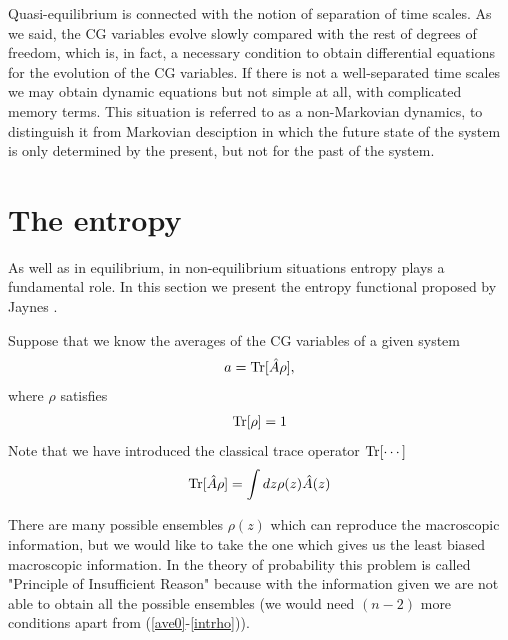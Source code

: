 \documentclass[a4paper,openright,12pt]{book}
\begin{document}
Quasi-equilibrium is connected with the notion of separation of time scales. As we said, the CG variables evolve slowly compared with the rest of degrees of freedom, which is, in fact, a necessary condition to obtain differential equations for the evolution of the CG variables. If there is not a well-separated time scales we may obtain dynamic equations but not simple at all, with complicated memory terms. This situation is referred to as a non-Markovian dynamics, to distinguish it from Markovian desciption in which the future state of the system is only determined by the present, but not for the past of the system. 

\section{The entropy}\label{sec:TheEntropy}
As well as in equilibrium, in non-equilibrium situations entropy plays a fundamental role. In this section we present the entropy functional proposed by Jaynes \cite{Jaynes1957}.

Suppose that we know the averages of the CG variables of a given system 
\begin{align}
    a = {\rm Tr}[{\hat{A}}\rho] ,
    \label{ave0}
\end{align}
where $\rho$ satisfies
\begin{align}
    {\rm Tr}[\rho] = 1
    \label{intrho}
\end{align}
Note that we have introduced the classical trace operator ${\rm Tr}[\cdots]$
\begin{align}
    {\rm Tr}[\hat{A}\rho] = \int dz\rho(z)\hat{A}(z) 
\end{align}

There are many possible ensembles $\rho(z)$ which can reproduce the macroscopic information, but we would like to take the one which gives us the least biased macroscopic information.
In the theory of probability this problem is called "Principle of Insufficient Reason" because with the information given we are not able to obtain all the possible ensembles (we would need $(n-2)$ more conditions apart from (\ref{ave0}-\ref{intrho})).
\end{document}
